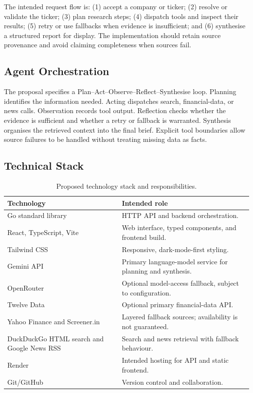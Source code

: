 \documentclass[12pt,a4paper,oneside]{report}
\begin{document}
The intended request flow is: (1) accept a company or ticker; (2) resolve or validate the ticker; (3) plan research steps; (4) dispatch tools and inspect their results; (5) retry or use fallbacks when evidence is insufficient; and (6) synthesise a structured report for display. The implementation should retain source provenance and avoid claiming completeness when sources fail.

\subsection{Agent Orchestration}
The proposal specifies a Plan--Act--Observe--Reflect--Synthesise loop. Planning identifies the information needed. Acting dispatches search, financial-data, or news calls. Observation records tool output. Reflection checks whether the evidence is sufficient and whether a retry or fallback is warranted. Synthesis organises the retrieved context into the final brief. Explicit tool boundaries allow source failures to be handled without treating missing data as facts.

\subsection{Technical Stack}
\begin{table}[H]\centering\small
\begin{tabularx}{\textwidth}{>{\raggedright\arraybackslash}p{3.3cm}X}
\toprule \textbf{Technology} & \textbf{Intended role}\\\midrule
Go standard library & HTTP API and backend orchestration.\\
React, TypeScript, Vite & Web interface, typed components, and frontend build.\\
Tailwind CSS & Responsive, dark-mode-first styling.\\
Gemini API & Primary language-model service for planning and synthesis.\\
OpenRouter & Optional model-access fallback, subject to configuration.\\
Twelve Data & Optional primary financial-data API.\\
Yahoo Finance and Screener.in & Layered fallback sources; availability is not guaranteed.\\
DuckDuckGo HTML search and Google News RSS & Search and news retrieval with fallback behaviour.\\
Render & Intended hosting for API and static frontend.\\
Git/GitHub & Version control and collaboration.\\
\bottomrule
\end{tabularx}
\caption{Proposed technology stack and responsibilities.}
\label{tab:stack}
\end{table}
\end{document}
